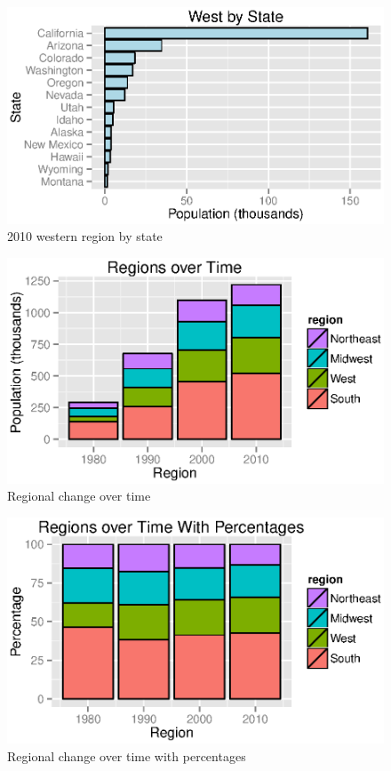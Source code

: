 \documentclass{exam}
\begin{document}
  \begin{figure}[H]
    \centering
    \includegraphics[scale = 0.9]{figures/west_by_state.eps}
    \caption{2010 western region by state}
  \end{figure}

  \begin{figure}[H]
    \centering
    \includegraphics[scale = 0.9]{figures/regions_over_time.eps}
    \caption{Regional change over time}
  \end{figure}

  \begin{figure}[H]
    \centering
    \includegraphics[scale = 0.9]{figures/regions_over_time_percentages.eps}
    \caption{Regional change over time with percentages}
  \end{figure}
\end{document}
